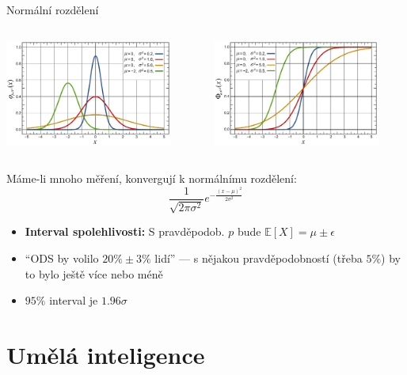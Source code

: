 \documentclass{beamer}
\begin{document}
\subsection{}
\begin{frame}{Normální rozdělení}
\begin{columns}
	\begin{column}{5.5cm}
		\includegraphics[width=5.5cm]{Normal_Distribution_PDF.pdf}
	\end{column}
	\begin{column}{5.5cm}
		\includegraphics[width=5.5cm]{Normal_Distribution_CDF.pdf}
	\end{column}
\end{columns}

\begin{center}
Máme-li mnoho měření, konvergují k normálnímu rozdělení:
	$$ \frac{1}{\sqrt{2\pi \sigma^2}} e^{-\frac{(x-\mu)^2}{2 \sigma^2}} $$
\end{center}

\begin{itemize}
\item {\bf Interval spolehlivosti:} S pravděpodob. $p$ bude $\mathbb{E}[X] = \mu \pm \epsilon$
\item ``ODS by volilo $20\% \pm 3\%$ lidí'' --- s nějakou pravděpodobností (třeba $5\%$) by to bylo ještě více nebo méně
\item $95\%$ interval je $1.96\sigma$
\end{itemize}

\end{frame}

\section{Umělá inteligence}
\end{document}
